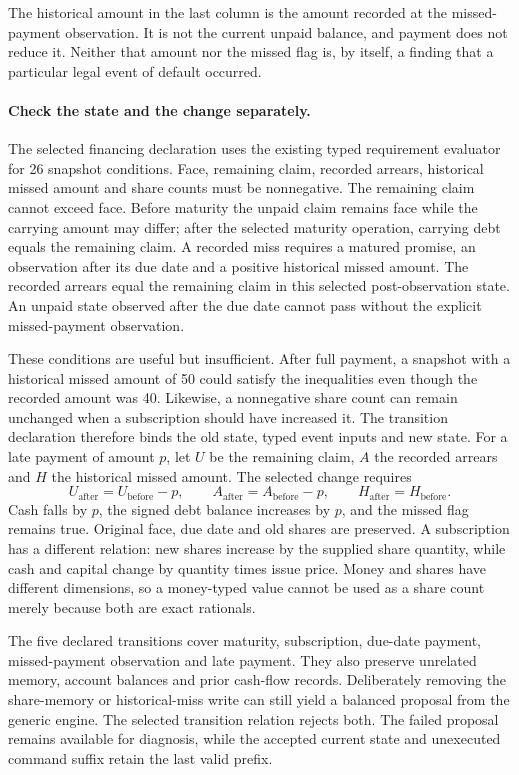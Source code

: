 The historical amount in the last column is the amount recorded at the
missed-payment observation. It is not the current unpaid balance, and payment
does not reduce it. Neither that amount nor the missed flag is, by itself,
a finding that a particular legal event of default occurred.

\paragraph{Check the state and the change separately.}
The selected financing declaration uses the existing typed requirement
evaluator for 26 snapshot conditions. Face, remaining claim, recorded arrears,
historical missed amount and share counts must be nonnegative. The remaining
claim cannot exceed face. Before maturity the unpaid claim remains face while
the carrying amount may differ; after the selected maturity operation, carrying
debt equals the remaining claim. A recorded miss requires a matured promise,
an observation after its due date and a positive historical missed amount.
The recorded arrears equal the remaining claim in this selected post-observation
state. An unpaid state observed after the due date cannot pass without the
explicit missed-payment observation.

These conditions are useful but insufficient. After full payment, a snapshot
with a historical missed amount of 50 could satisfy the inequalities even
though the recorded amount was 40. Likewise, a nonnegative share count can
remain unchanged when a subscription should have increased it. The transition
declaration therefore binds the old state, typed event inputs and new state.
For a late payment of amount \(p\), let \(U\) be the remaining claim,
\(A\) the recorded arrears and \(H\) the historical missed amount. The
selected change requires
\[
  U_{\mathrm{after}}=U_{\mathrm{before}}-p,\qquad
  A_{\mathrm{after}}=A_{\mathrm{before}}-p,\qquad
  H_{\mathrm{after}}=H_{\mathrm{before}}.
\]
Cash falls by \(p\), the signed debt balance increases by \(p\), and the
missed flag remains true. Original face, due date and old shares are preserved.
A subscription has a different relation: new shares increase by the supplied
share quantity, while cash and capital change by quantity times issue price.
Money and shares have different dimensions, so a money-typed value cannot be
used as a share count merely because both are exact rationals.

The five declared transitions cover maturity, subscription, due-date payment,
missed-payment observation and late payment. They also preserve unrelated
memory, account balances and prior cash-flow records. Deliberately removing
the share-memory or historical-miss write can still yield a balanced proposal
from the generic engine. The selected transition relation rejects both. The
failed proposal remains available for diagnosis, while the accepted current
state and unexecuted command suffix retain the last valid prefix.

